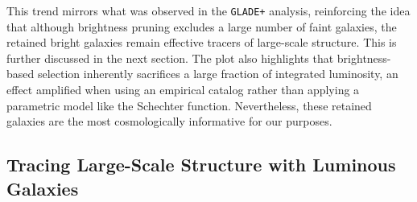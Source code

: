 This trend mirrors what was observed in the \texttt{GLADE+} analysis, reinforcing the idea that although brightness pruning excludes a large number of faint galaxies, the retained bright galaxies remain effective tracers of large-scale structure. This is further discussed in the next section. The plot also highlights that brightness-based selection inherently sacrifices a large fraction of integrated luminosity, an effect amplified when using an empirical catalog rather than applying a parametric model like the Schechter function. Nevertheless, these retained galaxies are the most cosmologically informative for our purposes.

\subsection{Tracing Large-Scale Structure with Luminous Galaxies}

